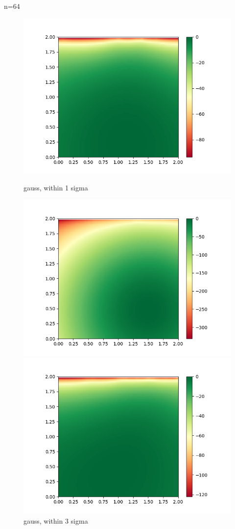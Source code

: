\documentclass[english]{scrartcl}
\begin{document}
\par n=64
\begin{figure}[H]
	\includegraphics[width=\linewidth]{lighthouse/2d/gauss_1sigma_n=64}
	\caption{gauss, within 1 sigma}  
	\endminipage \hfill
	\includegraphics[width=\linewidth]{lighthouse/2d/gauss_3sigma_n=64}
	\caption{gauss, within 3 sigma} 
	\endminipage \hfill
	\includegraphics[width=\linewidth]{lighthouse/2d/unif_n=64}

\end{figure}
\end{document}
